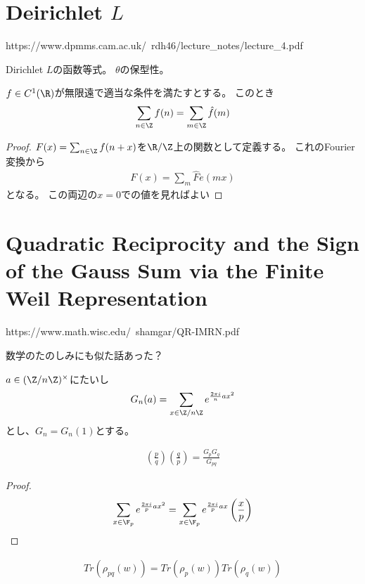 \documentclass{jsarticle}
\begin{document}
\section{Deirichlet $L$}
https://www.dpmms.cam.ac.uk/~rdh46/lecture\_notes/lecture\_4.pdf

Dirichlet $L$の函数等式。
$\theta$の保型性。

\begin{thm}[Poisson和公式]
$f\in C^1(\R)$が無限遠で適当な条件を満たすとする。
このとき
\begin{align*}
\sum_{n\in\Z}f(n)=\sum_{m\in\Z}\hat{f}(m)
\end{align*}
\end{thm}

\begin{proof}
$F(x)=\sum_{n\in\Z}f(n+x)$を$\R/\Z$上の関数として定義する。
これのFourier変換から
\begin{align*}
F(x)=\sum_m\hat{F}e(mx)
\end{align*}
となる。
この両辺の$x=0$での値を見ればよい
\end{proof}

\section{Quadratic Reciprocity and the Sign of the Gauss Sum via the Finite Weil Representation}
https://www.math.wisc.edu/~shamgar/QR-IMRN.pdf

数学のたのしみにも似た話あった？

\begin{dfn}[Gauss和]
$a\in(\Z/n\Z)^\times$にたいし
\begin{align*}
G_n(a)=\sum_{x\in\Z/n\Z}e^{\frac{2\pi i}{n}ax^2}
\end{align*}
とし、$G_n=G_n(1)$とする。
\end{dfn}

\begin{lem}[Lemma 4.1]
\begin{align*}
\left(\frac{p}{q}\right)\left(\frac{q}{p}\right)=\frac{G_pG_q}{G_{pq}}
\end{align*}
\end{lem}
\begin{proof}
\begin{align*}
\sum_{x\in\F_p}e^{\frac{2\pi i}{p}ax^2}=\sum_{x\in\F_p}e^{\frac{2\pi i}{p}ax}\left(\frac{x}{p}\right)
\end{align*}
\end{proof}


\begin{prop}[Proposition 4.2]
\begin{align*}
Tr(\rho_{pq}(w))=Tr(\rho_p(w))Tr(\rho_q(w))
\end{align*}
\end{prop}
\end{document}
